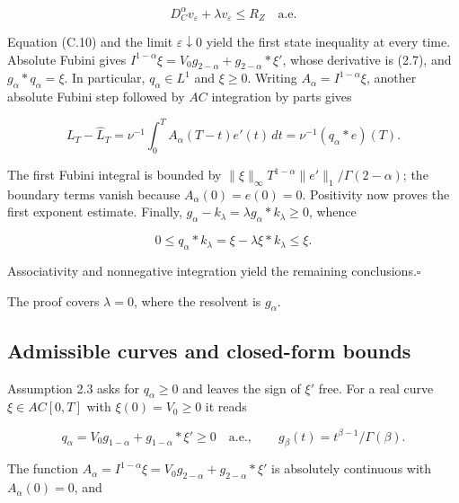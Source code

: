 \documentclass[11pt,a4paper]{article}
\newcommand{\proofend}{\hfill\(\square\)\par\addvspace{0.6\baselineskip}}
\begin{document}
\begin{equation*}\tag{C.13}
D_C^\alpha v_\varepsilon+\lambda v_\varepsilon\le R_Z\quad\text{a.e.}
\end{equation*}

\noindent Equation (C.10) and the limit \(\varepsilon\downarrow0\) yield the first state inequality at every time. Absolute Fubini gives \(I^{1-\alpha}\xi=V_0g_{2-\alpha}+g_{2-\alpha}*\xi'\), whose derivative is (2.7), and \(g_\alpha*q_\alpha=\xi\). In particular, \(q_\alpha\in L^1\) and \(\xi\ge0\). Writing \(A_\alpha=I^{1-\alpha}\xi\), another absolute Fubini step followed by \(AC\) integration by parts gives

\begin{equation*}\tag{C.14}
L_T-\widehat L_T
=\nu^{-1}\int_0^TA_\alpha(T-t)e'(t)\,dt
=\nu^{-1}(q_\alpha*e)(T).
\end{equation*}

The first Fubini integral is bounded by \(\|\xi\|_\infty T^{1-\alpha}\|e'\|_1/\Gamma(2-\alpha)\); the boundary terms vanish because \(A_\alpha(0)=e(0)=0\). Positivity now proves the first exponent estimate. Finally, \(g_\alpha-k_\lambda=\lambda g_\alpha*k_\lambda\ge0\), whence

\begin{equation*}\tag{C.15}
0\le q_\alpha*k_\lambda
=\xi-\lambda\xi*k_\lambda\le\xi.
\end{equation*}

Associativity and nonnegative integration yield the remaining conclusions.\proofend

The proof covers \(\lambda=0\), where the resolvent is \(g_\alpha\).

\setcounter{subsection}{2}\subsection{Admissible curves and closed-form bounds}

Assumption 2.3 asks for \(q_\alpha\ge0\) and leaves the sign of \(\xi'\) free. For a real curve \(\xi\in AC[0,T]\) with \(\xi(0)=V_0\ge0\) it reads

\begin{equation*}\tag{C.16}
q_\alpha=V_0g_{1-\alpha}+g_{1-\alpha}*\xi'\ge0
\quad\text{a.e.},\qquad g_\beta(t)=t^{\beta-1}/\Gamma(\beta).
\end{equation*}

The function \(A_\alpha=I^{1-\alpha}\xi=V_0g_{2-\alpha}+g_{2-\alpha}*\xi'\) is absolutely continuous with \(A_\alpha(0)=0\), and
\end{document}
